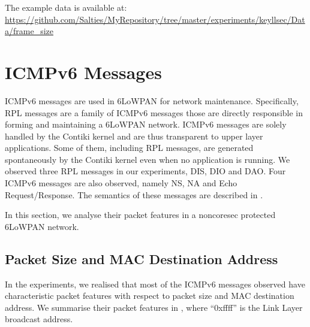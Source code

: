 The example data is available at: \\
\url{https://github.com/Salties/MyRepository/tree/master/experiments/keyllsec/Data/frame_size}


\section{ICMPv6 Messages}

ICMPv6 messages are used in 6LoWPAN for network maintenance. Specifically, RPL messages are a family of ICMPv6 messages those are directly responsible in forming and maintaining a 6LoWPAN network. ICMPv6 messages are solely handled by the Contiki kernel and are thus transparent to upper layer applications. Some of them, including RPL messages, are generated spontaneously by the Contiki kernel even when no application is running. We observed three RPL messages in our experiments, DIS, DIO and DAO. Four ICMPv6 messages are also observed, namely NS, NA and Echo Request/Response. The semantics of these messages are described in .

In this section, we analyse their packet features in a noncoresec protected 6LoWPAN network.

\subsection{Packet Size and MAC Destination Address} \label{Size and Dst of ICMP}

In the experiments, we realised that most of the ICMPv6 messages observed have characteristic packet features with respect to packet size and MAC destination address. We summarise their packet features in , where ``0xffff'' is the Link Layer broadcast address.

